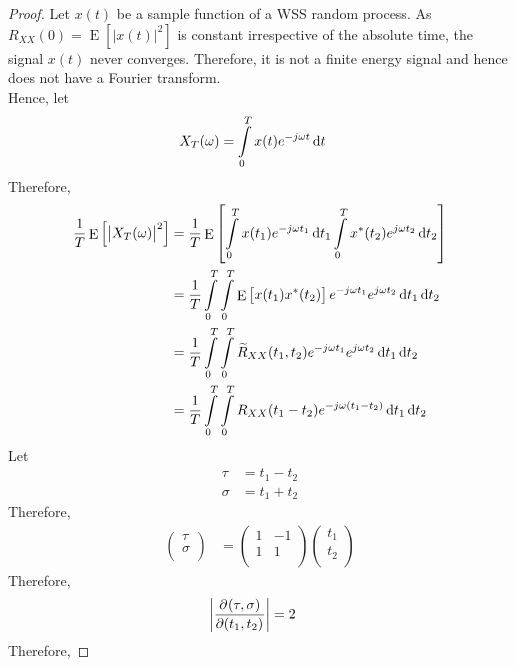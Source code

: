 \documentclass[titlepage, fleqn, a4paper, 12pt, twoside]{article}
\theoremstyle{definition}
\theoremstyle{theorem}
\renewcommand{\tilde}{\widetilde}
\DeclareMathOperator{\expct}{\mathrm{E}}
\begin{document}
\begin{proof}
	Let $x(t)$ be a sample function of a WSS random process.
	As $R_{X X}(0) = \expct\left[ \left| x(t) \right|^2 \right]$ is constant irrespective of the absolute time, the signal $x(t)$ never converges.
	Therefore, it is not a finite energy signal and hence does not have a Fourier transform.\\
	Hence, let
	\begin{align*}
		X_T(\omega) &= \int\limits_{0}^{T} x(t) e^{-j \omega t} \dif t
	\end{align*}
	Therefore,
	\begin{align*}
		\frac{1}{T} \expct\left[ \left| X_T(\omega) \right|^2 \right] &= \frac{1}{T} \expct\left[ \int\limits_{0}^{T} x(t_1) e^{-j \omega t_1} \dif t_1 \int\limits_{0}^{T} x^*(t_2) e^{j \omega t_2} \dif t_2 \right]\\
		&= \frac{1}{T} \int\limits_{0}^{T} \int\limits_{0}^{T} \expct\left[ x(t_1) x^*(t_2) \right] e^{-j \omega t_1} e^{j \omega t_2} \dif t_1 \dif t_2\\
		&= \frac{1}{T} \int\limits_{0}^{T} \int\limits_{0}^{T} {\tilde{R}_{X X}}(t_1,t_2) e^{-j \omega t_1} e^{j \omega t_2} \dif t_1 \dif t_2\\
		&= \frac{1}{T} \int\limits_{0}^{T} \int\limits_{0}^{T} R_{X X}(t_1 - t_2) e^{-j \omega (t_1 - t_2)} \dif t_1 \dif t_2
	\end{align*}
	Let
	\begin{align*}
		\tau &= t_1 - t_2\\
		\sigma &= t_1 + t_2
	\end{align*}
	Therefore,
	\begin{align*}
			\begin{pmatrix}
				\tau\\
				\sigma\\
			\end{pmatrix}
		&=
			\begin{pmatrix}
				1 & -1\\
				1 & 1\\
			\end{pmatrix}
			\begin{pmatrix}
				t_1\\
				t_2\\
			\end{pmatrix}
	\end{align*}
	Therefore,
	\begin{align*}
		\left| \dpd{(\tau,\sigma)}{(t_1,t_2)} \right| &= 2
	\end{align*}
	Therefore,

\end{proof}
\end{document}

